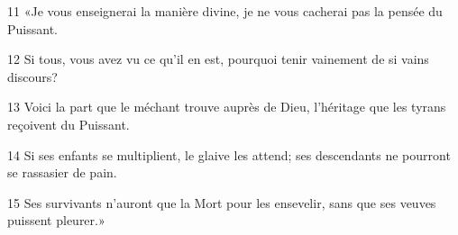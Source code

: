 
11 «Je vous enseignerai la manière divine, je ne vous cacherai pas la pensée du Puissant.

12 Si tous, vous avez vu ce qu’il en est, pourquoi tenir vainement de si vains discours?

13 Voici la part que le méchant trouve auprès de Dieu, l’héritage que les tyrans reçoivent du Puissant.

14 Si ses enfants se multiplient, le glaive les attend; ses descendants ne pourront se rassasier de pain.

15 Ses survivants n’auront que la Mort pour les ensevelir, sans que ses veuves puissent pleurer.»